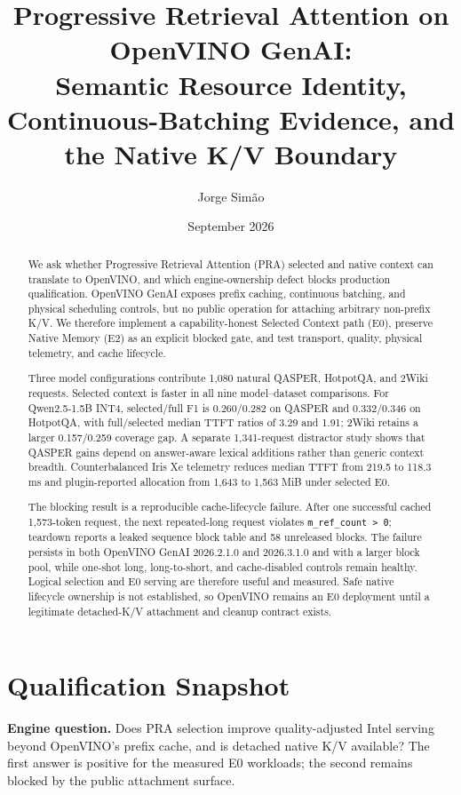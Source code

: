 \documentclass[10pt]{article}
\title{Progressive Retrieval Attention on OpenVINO GenAI:\\
Semantic Resource Identity, Continuous-Batching Evidence, and the Native K/V Boundary}
\author{Jorge Sim\~ao}
\date{September 2026}
\begin{document}
\maketitle

\begin{abstract}
We ask whether Progressive Retrieval Attention (PRA) selected and native
context can translate to OpenVINO, and which engine-ownership defect blocks
production qualification. OpenVINO GenAI exposes prefix caching, continuous
batching, and physical scheduling controls, but no public operation for
attaching arbitrary non-prefix K/V. We therefore implement a capability-honest
Selected Context path (E0), preserve Native Memory (E2) as an explicit blocked
gate, and test transport, quality, physical telemetry, and cache lifecycle.

Three model configurations contribute 1,080 natural QASPER, HotpotQA, and
2Wiki requests. Selected context is faster in all nine model--dataset
comparisons. For Qwen2.5-1.5B INT4, selected/full F1 is 0.260/0.282 on QASPER
and 0.332/0.346 on HotpotQA, with full/selected median TTFT ratios of 3.29 and
1.91; 2Wiki retains a larger 0.157/0.259 coverage gap. A separate
1,341-request distractor study shows that QASPER gains depend on answer-aware
lexical additions rather than generic context breadth. Counterbalanced Iris Xe
telemetry reduces median TTFT from 219.5 to 118.3 ms and plugin-reported
allocation from 1,643 to 1,563 MiB under selected E0.

The blocking result is a reproducible cache-lifecycle failure. After one
successful cached 1,573-token request, the next repeated-long request violates
\texttt{m\_ref\_count > 0}; teardown reports a leaked sequence block table and
58 unreleased blocks. The failure persists in both OpenVINO GenAI 2026.2.1.0
and 2026.3.1.0 and with a larger block pool, while one-shot long,
long-to-short, and cache-disabled controls remain healthy. Logical selection
and E0 serving are therefore useful and measured. Safe native lifecycle
ownership is not established, so OpenVINO remains an E0 deployment until a
legitimate detached-K/V attachment and cleanup contract exists.
\end{abstract}

\section{Qualification Snapshot}
\textbf{Engine question.} Does PRA selection improve quality-adjusted Intel
serving beyond OpenVINO's prefix cache, and is detached native K/V available?
The first answer is positive for the measured E0 workloads; the second remains
blocked by the public attachment surface.
\end{document}
